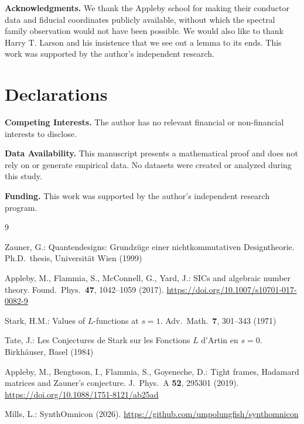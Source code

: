 \documentclass[12pt]{article}
\theoremstyle{plain}
\theoremstyle{definition}
\theoremstyle{remark}
\begin{document}
\vspace{1em}
\noindent\textbf{Acknowledgments.} We thank the Appleby school for making their conductor data and fiducial coordinates publicly available, without which the spectral family observation would not have been possible. We would also like to thank Harry T. Larson and his insistence that we see out a lemma to its ends. This work was supported by the author's independent research.

\section*{Declarations}

\noindent\textbf{Competing Interests.} The author has no relevant financial or non-financial interests to disclose.

\noindent\textbf{Data Availability.} This manuscript presents a mathematical proof and does not rely on or generate empirical data. No datasets were created or analyzed during this study.

\noindent\textbf{Funding.} This work was supported by the author's independent research program.

\begin{thebibliography}{9}

Zauner, G.: Quantendesigns: Grundz\"uge einer nichtkommutativen Designtheorie. Ph.D.\ thesis, Universit\"at Wien (1999)

Appleby, M., Flammia, S., McConnell, G., Yard, J.: SICs and algebraic number theory. Found.\ Phys.\ \textbf{47}, 1042--1059 (2017). \url{https://doi.org/10.1007/s10701-017-0082-9}

Stark, H.M.: Values of $L$-functions at $s=1$. Adv.\ Math.\ \textbf{7}, 301--343 (1971)

Tate, J.: Les Conjectures de Stark sur les Fonctions $L$ d'Artin en $s=0$. Birkh\"auser, Basel (1984)

Appleby, M., Bengtsson, I., Flammia, S., Goyeneche, D.: Tight frames, Hadamard matrices and Zauner's conjecture. J.\ Phys.\ A \textbf{52}, 295301 (2019). \url{https://doi.org/10.1088/1751-8121/ab25ad}

Mills, L.: SynthOmnicon (2026). \url{https://github.com/umpolungfish/synthomnicon}

\end{thebibliography}
\end{document}
